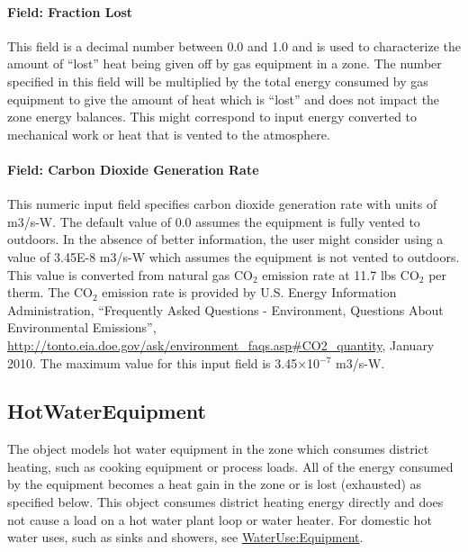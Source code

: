\paragraph{Field: Fraction Lost}\label{field-fraction-lost-1-gas-definition}

This field is a decimal number between 0.0 and 1.0 and is used to characterize the amount of ``lost'' heat being given off by gas equipment in a zone. The number specified in this field will be multiplied by the total energy consumed by gas equipment to give the amount of heat which is ``lost'' and does not impact the zone energy balances. This might correspond to input energy converted to mechanical work or heat that is vented to the atmosphere.

\paragraph{Field: Carbon Dioxide Generation Rate}\label{field-carbon-dioxide-generation-rate-1-gas-definition}

This numeric input field specifies carbon dioxide generation rate with units of m3/s-W. The default value of 0.0 assumes the equipment is fully vented to outdoors. In the absence of better information, the user might consider using a value of 3.45E-8 m3/s-W which assumes the equipment is not vented to outdoors. This value is converted from natural gas CO\(_{2}\) emission rate at 11.7 lbs CO\(_{2}\) per therm. The CO\(_{2}\) emission rate is provided by U.S. Energy Information Administration, ``Frequently Asked Questions - Environment, Questions About Environmental Emissions'', \url{http://tonto.eia.doe.gov/ask/environment_faqs.asp#CO2_quantity}, January 2010. The maximum value for this input field is 3.45$\times$10$^{-7}$ m3/s-W.

\subsection{HotWaterEquipment}\label{hotwaterequipment}

The object models hot water equipment in the zone which consumes district heating, such as cooking equipment or process loads. All of the energy consumed by the equipment becomes a heat gain in the zone or is lost (exhausted) as specified below. This object consumes district heating energy directly and does not cause a load on a hot water plant loop or water heater. For domestic hot water uses, such as sinks and showers, see \hyperref[wateruseequipment]{WaterUse:Equipment}.

